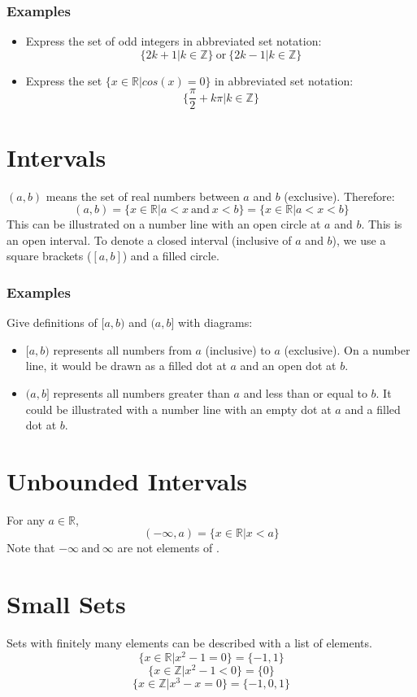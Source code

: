 \documentclass[12pt]{report}
\newcommand{\Z}{\mathbb{Z}}
\newcommand{\R}{\mathbb{R}}
\begin{document}
\begin{flushleft}
\subsubsection*{Examples}

\begin{itemize}
\item Express the set of odd integers in abbreviated set notation: 
\[\{2k + 1 | k \in \Z\} \:\mathrm{or}\: \{2k - 1 | k \in \Z\}\]
\item Express the set \(\{x \in \R | cos(x) = 0\}\) in abbreviated set 
notation: 
\[\{\frac{\pi}{2} + k\pi | k \in \Z\}\]
\end{itemize}


\section*{Intervals}
\((a, b)\) means the set of real numbers between \(a\) and \(b\) (exclusive).
Therefore:
\[(a, b) = \{ x \in \R | a < x \:\mathrm{and}\: x < b\} = 
\{ x \in \R | a < x < b\} \]
This can be illustrated on a number line with an open circle at \(a\) and 
\(b\). This is an open interval. To denote a closed interval (inclusive of 
\(a\) and \(b\)), we use a square brackets (\([a, b]\)) and a filled circle.

\subsubsection*{Examples}
Give definitions of \([a, b)\) and \((a, b]\) with diagrams:
\begin{itemize}
\item \([a, b)\) represents all numbers from \(a\) (inclusive) to \(a\) 
(exclusive). On a number line, it would be drawn as a filled dot at \(a\) 
and an open dot at \(b\).
\item \((a, b]\) represents all numbers greater than \(a\) and less than or 
equal to \(b\). It could be illustrated with a number line with an empty dot
 at \(a\) and a filled dot at \(b\).
\end{itemize}


\section*{Unbounded Intervals}
For any \(a \in \R\), 
\[(-\infty, a) = \{x \in \R | x < a\}\]
Note that \(-\infty \:\mathrm{and}\: \infty\) are not elements of .

\section*{Small Sets}
Sets with finitely many elements can be described with a list of elements.
\[\{x \in \R | x^2 - 1 = 0\} = \{-1, 1\}\]
\[\{x \in \Z | x^2 - 1 < 0\} = \{0\}\]
\[\{x \in \Z | x^3 - x = 0\} = \{-1, 0, 1\}\]


\end{flushleft}
\end{document}

